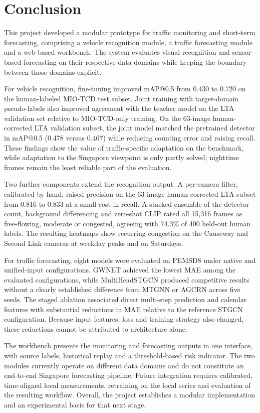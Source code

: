 \section{Conclusion}\label{sec:conclusion}

This project developed a modular prototype for traffic monitoring and
short-term forecasting, comprising a vehicle recognition module, a traffic
forecasting module and a web-based workbench. The system evaluates visual
recognition and sensor-based forecasting on their respective data domains while
keeping the boundary between those domains explicit.

For vehicle recognition, fine-tuning improved mAP@0.5 from 0.430 to 0.720 on the
human-labeled MIO-TCD test subset. Joint training with target-domain
pseudo-labels also improved agreement with the teacher model on the LTA
validation set relative to MIO-TCD-only training. On the 63-image human-corrected LTA
validation subset, the joint model matched the pretrained detector in mAP@0.5 (0.478 versus
0.467) while reducing counting error and raising recall. These findings show the
value of traffic-specific adaptation on the benchmark, while adaptation to the
Singapore viewpoint is only partly solved; nighttime frames remain the least
reliable part of the evaluation.

Two further components extend the recognition output. A per-camera filter, calibrated by
hand, raised precision on the 63-image human-corrected LTA subset from 0.816 to 0.833 at a
small cost in recall. A stacked ensemble of the detector count, background
differencing and zero-shot CLIP rated all 15,316 frames as free-flowing,
moderate or congested, agreeing with 74.3\% of 400 held-out human labels. The
resulting heatmaps show recurring congestion on the Causeway and Second Link
cameras at weekday peaks and on Saturdays.

For traffic forecasting, eight models were evaluated on PEMSD8 under native and
unified-input configurations. GWNET achieved the lowest MAE among the evaluated
configurations, while MultiHeadSTGCN produced competitive results without a
clearly established difference from MTGNN or AGCRN across five seeds. The staged
ablation associated direct multi-step prediction and calendar features with
substantial reductions in MAE relative to the reference STGCN configuration.
Because input features, loss and training strategy also changed, these
reductions cannot be attributed to architecture alone.

The workbench presents the monitoring and forecasting outputs in one interface,
with source labels, historical replay and a threshold-based risk indicator. The
two modules currently operate on different data domains and do not constitute an
end-to-end Singapore forecasting pipeline. Future integration requires
calibrated, time-aligned local measurements, retraining on the local series and
evaluation of the resulting workflow. Overall, the project establishes a modular
implementation and an experimental basis for that next stage.
